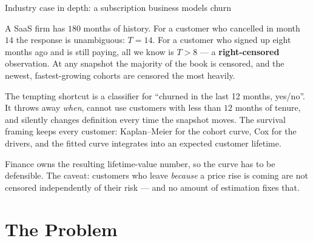 \documentclass[aspectratio=169,11pt]{beamer}
\begin{document}
\begin{frame}{Industry case in depth: a subscription business models churn}
  \footnotesize
  \begin{industry}
    A SaaS firm has $180$ months of history. For a customer who cancelled in month $14$ the
    response is unambiguous: $T=14$. For a customer who signed up eight months ago and is
    still paying, all we know is $T>8$ --- a \textbf{right-censored} observation. At any
    snapshot the majority of the book is censored, and the newest, fastest-growing cohorts
    are censored the most heavily.
  \end{industry}
  \begin{readme}
    The tempting shortcut is a classifier for ``churned in the last 12 months, yes/no''. It
    throws away \emph{when}, cannot use customers with less than $12$ months of tenure, and
    silently changes definition every time the snapshot moves. The survival framing keeps
    every customer: Kaplan--Meier for the cohort curve, Cox for the drivers, and the fitted
    curve integrates into an expected customer lifetime.
  \end{readme}
  \begin{takeaway}
    Finance owns the resulting lifetime-value number, so the curve has to be defensible.
    The caveat: customers who leave \emph{because} a price rise is coming are not censored
    independently of their risk --- and no amount of estimation fixes that.
  \end{takeaway}
\end{frame}

\section{The Problem}
\end{document}
